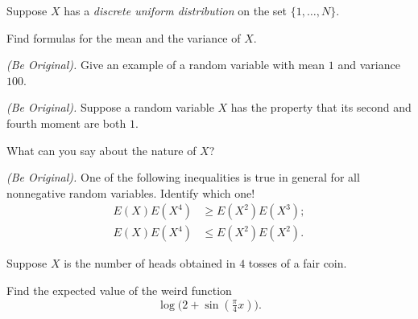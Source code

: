 \begin{problem}[Handout 7, \# 10]
  Suppose \(X\) has a \emph{discrete uniform distribution} on the set
  \(\{1,\dotsc,N\}\).

  Find formulas for the mean and the variance of \(X\).
\end{problem}
\begin{solution}

\end{solution}
\newpage

\begin{problem}[Handout 7, \# 11]
  \emph{(Be Original).} Give an example of a random variable with mean
  \(1\) and variance \(100\).
\end{problem}
\begin{solution}

\end{solution}
\newpage

\begin{problem}[Handout 7, \# 13]
  \emph{(Be Original).} Suppose a random variable \(X\) has the property
  that its second and fourth moment are both \(1\).

  What can you say about the nature of \(X\)?
\end{problem}
\begin{solution}

\end{solution}
\newpage

\begin{problem}[Handout 7, \# 14]
  \emph{(Be Original).} One of the following inequalities is true in
  general for all nonnegative random variables. Identify which one!
  \begin{align*}
    E(X)E(X^4)&\geq E(X^2)E(X^3);\\
    E(X)E(X^4)&\leq E(X^2)E(X^2).
  \end{align*}
\end{problem}
\begin{solution}

\end{solution}
\newpage

\begin{problem}[Handout 7, \# 15]
  Suppose \(X\) is the number of heads obtained in \(4\) tosses of a fair
  coin.

  Find the expected value of the weird function
  \[
    \log\bigl( 2+\sin(\tfrac{\pi}{4}x) \bigr).
  \]
\end{problem}
\begin{solution}

\end{solution}
\newpage

